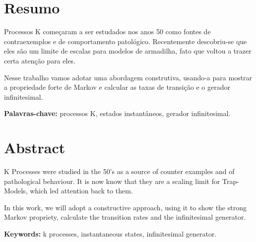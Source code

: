 

\chapter*{Resumo}

Processos K começaram a ser estudados nos anos 50 como fontes de
contraexemplos e de comportamento patológico. Recentemente
descobriu-se que eles são um limite de escalas para modelos de
armadilha, fato que voltou a trazer certa atenção para eles.

Nesse trabalho vamos adotar uma abordagem construtiva, usando-a para
mostrar a propriedade forte de Markov e calcular as taxas de transição
e o gerador infinitesimal.

\noindent \textbf{Palavras-chave:} processos K, estados instantâneos,
gerador infinitesimal.

\chapter*{Abstract}

K Processes were studied in the 50's as a source of counter examples
and of pathological behaviour. It is now know that they are a scaling
limit for Trap-Models, which led attention back to them.

In this work, we will adopt a constructive approach, using it to show
the strong Markov propriety, calculate the transition rates and
the infinitesimal generator.

\noindent \textbf{Keywords:} k processes, instantaneous states,
infinitesimal generator.


